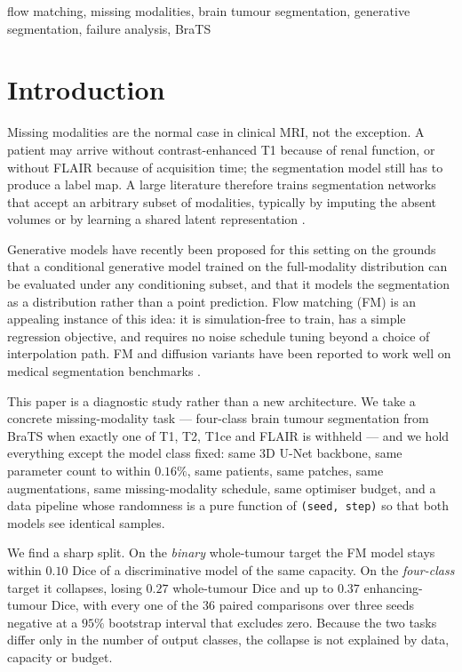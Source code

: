 \documentclass[conference]{IEEEtran}
\begin{document}
\begin{IEEEkeywords}
flow matching, missing modalities, brain tumour segmentation, generative
segmentation, failure analysis, BraTS
\end{IEEEkeywords}

\section{Introduction}

Missing modalities are the normal case in clinical MRI, not the exception.
A patient may arrive without contrast-enhanced T1 because of renal function, or
without FLAIR because of acquisition time; the segmentation model still has to
produce a label map. A large literature therefore trains segmentation networks
that accept an arbitrary subset of modalities, typically by imputing the absent
volumes or by learning a shared latent representation
\cite{havaei2016hemis, dorent2019hetero, zhang2022mmformer, azad2022smunet,
wang2023shaspec}.

Generative models have recently been proposed for this setting on the grounds
that a conditional generative model trained on the full-modality distribution
can be evaluated under any conditioning subset, and that it models the
segmentation as a distribution rather than a point prediction. Flow matching
(FM) \cite{lipman2023flow, liu2023flow} is an appealing instance of this
idea: it is simulation-free to train, has a simple regression objective, and
requires no noise schedule tuning beyond a choice of interpolation path. FM and
diffusion variants have been reported to work well on medical segmentation
benchmarks \cite{amit2021segdiff, wu2023medsegdiff, xing2025diffunet,
bogensperger2025flowsdf}.

This paper is a diagnostic study rather than a new architecture. We take a
concrete missing-modality task --- four-class brain tumour segmentation from
BraTS when exactly one of T1, T2, T1ce and FLAIR is withheld --- and we hold
everything except the model class fixed: same 3D U-Net backbone, same parameter
count to within $0.16\%$, same patients, same patches, same augmentations, same
missing-modality schedule, same optimiser budget, and a data pipeline whose
randomness is a pure function of \texttt{(seed, step)} so that both models see
identical samples.

We find a sharp split. On the \emph{binary} whole-tumour target the FM model
stays within $0.10$ Dice of a discriminative model of the same capacity. On the
\emph{four-class} target it collapses, losing $0.27$ whole-tumour Dice and up to
$0.37$ enhancing-tumour Dice, with every one of the $36$ paired comparisons over
three seeds negative at a $95\%$ bootstrap interval that excludes zero. Because
the two tasks differ only in the number of output classes, the collapse is not
explained by data, capacity or budget.
\end{document}
